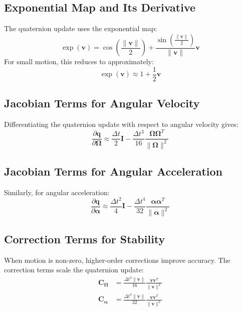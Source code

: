 \documentclass{article}
\begin{document}
\subsection{Exponential Map and Its Derivative}
The quaternion update uses the exponential map:
\begin{equation}
	\exp(\bm{v}) = \cos\left(\frac{\|\mathbf{v}\|}{2}\right) + \frac{\sin\left(\frac{\|\mathbf{v}\|}{2}\right)}{\|\mathbf{v}\|} \mathbf{v}
\end{equation}
For small motion, this reduces to approximately:
\begin{equation}
	\exp(\bm{v}) \approx 1 + \frac{1}{2} \bm{v}
\end{equation}

\subsection{Jacobian Terms for Angular Velocity}
Differentiating the quaternion update with respect to angular velocity gives:
\begin{equation}
	\frac{\partial \mathbf{q}}{\partial \mathbf{\Omega}} \approx \frac{\Delta t}{2} \mathbf{I} - \frac{\Delta t^3}{16} \frac{\mathbf{\Omega} \mathbf{\Omega}^T}{\|\mathbf{\Omega}\|^2}
\end{equation}

\subsection{Jacobian Terms for Angular Acceleration}
Similarly, for angular acceleration:
\begin{equation}
	\frac{\partial \mathbf{q}}{\partial \mathbf{\alpha}} \approx \frac{\Delta t^2}{4} \mathbf{I} - \frac{\Delta t^4}{32} \frac{\mathbf{\alpha} \mathbf{\alpha}^T}{\|\mathbf{\alpha}\|^2}
\end{equation}

\subsection{Correction Terms for Stability}
When motion is non-zero, higher-order corrections improve accuracy. The correction terms scale the quaternion update:
\begin{align*}
	\mathbf{C}_{\mathbf{\Omega}} &= \frac{\Delta t^3 \|\mathbf{v}\|}{16} \frac{\mathbf{v} \mathbf{v}^T}{\|\mathbf{v}\|^2} \\
	\mathbf{C}_{\mathbf{\alpha}} &= \frac{\Delta t^4 \|\mathbf{v}\|}{32} \frac{\mathbf{v} \mathbf{v}^T}{\|\mathbf{v}\|^2}
\end{align*}
\end{document}
